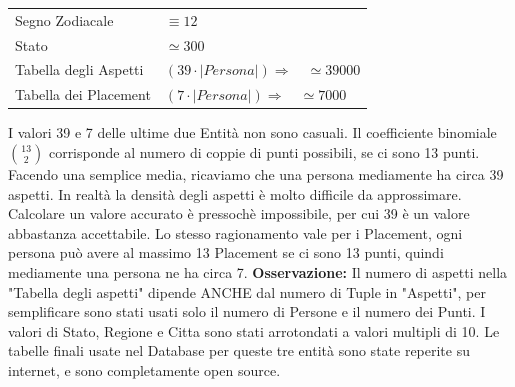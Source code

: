 {\begin{longtable}{ |p{4cm}|p{6cm}|  }
Segno Zodiacale & \begin{math} \equiv 12 \end{math} \\
Stato & \begin{math} \simeq 300 \end{math} \\
Tabella degli Aspetti & \begin{math} (39 \cdot |Persona|) \Rightarrow \quad \simeq 39000 \end{math} \\
Tabella dei Placement & \begin{math} (7 \cdot |Persona|) \Rightarrow \quad \simeq 7000 \end{math} \\
\hline
\end{longtable}
}
I valori 39 e 7 delle ultime due Entità non sono casuali.\newline
Il coefficiente binomiale \begin{math} \binom{13}{2} \end{math} corrisponde al numero di coppie di punti possibili, se ci sono 13 punti. Facendo una semplice media, ricaviamo che una persona mediamente ha circa 39 aspetti. In realtà la densità degli aspetti è molto difficile da approssimare. Calcolare un valore accurato è pressochè impossibile, per cui 39 è un valore abbastanza accettabile.\newline
Lo stesso ragionamento vale per i Placement, ogni persona può avere al massimo 13 Placement se ci sono 13 punti, quindi mediamente una persona ne ha circa 7.
\textbf{Osservazione:} Il numero di aspetti nella "Tabella degli aspetti" dipende ANCHE dal numero di Tuple in "Aspetti", per semplificare sono stati usati solo il numero di Persone e il numero dei Punti.
I valori di Stato, Regione e Citta sono stati arrotondati a valori multipli di 10. Le tabelle finali usate nel Database per queste tre entità sono state reperite su internet, e sono completamente open source.
